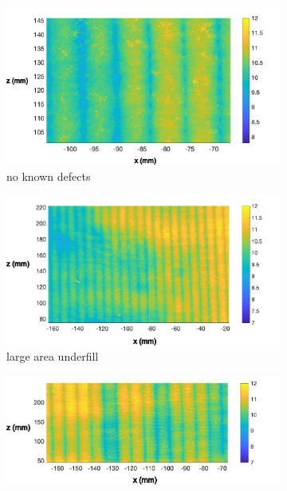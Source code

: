 \documentclass[12pt]{report}
\begin{document}
\begin{figure}[h!]
    \begin{subfigure}{0.5\textwidth}
        \centering
        \includegraphics[width=\linewidth]{figures/profile_measure/typical_rear_mesh.pdf}  
        \caption{no known defects}
        \label{fig:calib_line}
    \end{subfigure}
    \begin{subfigure}{0.5\textwidth}
        \centering
        \includegraphics[width=\linewidth]{figures/profile_measure/fbu_01_01_top.pdf}  
        \caption{large area underfill}
        \label{fig:calib_line}
    \end{subfigure}
    \newline
    \begin{subfigure}{0.5\textwidth}
        \centering
        \includegraphics[width=\linewidth]{figures/profile_measure/fbu_01_02_top.pdf}  

\end{subfigure}
\end{figure}
\end{document}

